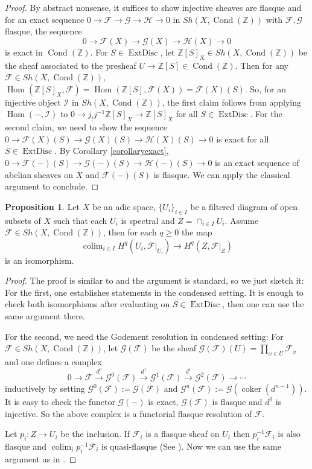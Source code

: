 \documentclass{article}
\theoremstyle{definition}
\newtheorem{proposition}[theorem]{Proposition}
\def\cG{\mathcal{G}}
\def\sF{{\mathscr{F}}}
\def\sG{{\mathscr{G}}}
\def\sH{{\mathscr{H}}}
\def\sI{{\mathscr{I}}}
\def\bZ{{\mathbb Z}}
\DeclareMathOperator{\coker}{coker}
\DeclareMathOperator{\colim}{colim}
\DeclareMathOperator{\Hom}{Hom}
\DeclareMathOperator{\cond}{Cond}
\DeclareMathOperator{\ExtDisc}{ExtDisc}
\begin{document}
	\begin{proof}
		By abstract nonsense, it suffices to show injective sheaves are flasque and for an exact sequence $0\to \sF\to \sG\to \sH\to 0$ in $\mathit{Sh}(X,\cond(\bZ))$ with $\sF,\sG$ flasque, the sequence 
		$$0\to \sF(X)\to \sG(X)\to \sH(X)\to 0$$
		is exact in $\cond(\bZ)$. For $S\in \ExtDisc$, let $\bZ[S]_X\in \mathit{Sh}(X,\cond(\bZ))$ be the sheaf associated to the presheaf $U\to \bZ[S]\in \cond(\bZ)$. Then for any $\sF\in \mathit{Sh}(X,\cond(\bZ))$, $\Hom(\bZ[S]_X,\sF)=\Hom(\bZ[S],\sF(X))=\sF(X)(S)$. So, for an injective object $\sI$ in $\mathit{Sh}(X,\cond(\bZ))$, the first claim follows from applying $\Hom(-,\sI)$ to $0\to j_!j^{-1}\bZ[S]_X\to \bZ[S]_X$ for all $S\in \ExtDisc$. For the second claim, we need to show the sequence $0\to \sF(X)(S)\to \sG(X)(S)\to \sH(X)(S)\to 0$ is exact for all $S\in \ExtDisc$. By Corollary \ref{corollaryexact}, $0\to \sF(-)(S)\to \sG(-)(S)\to \sH(-)(S)\to 0$ is an exact sequence of abelian sheaves on $X$ and $\sF(-)(S)$ is flasque. We can apply the classical argument to conclude. 
	\end{proof}
	
	
\begin{proposition}\label{propositionmaincolimit}
Let $X$ be an adic space, $\{U_i\}_{i\in I}$ be a filtered diagram of open subsets of $X$ such that each $U_i$ is spectral and $Z=\cap_{i\in I} U_i$. Assume $\sF\in \mathit{Sh}(X,\cond(\bZ))$, then for each $q\geq 0$ the map 
$$\colim_{i\in I} H^q(U_i,\sF|_{U_i})\to H^q(Z,\sF|_Z)$$
is an isomorphism.
\end{proposition}	

\begin{proof}
The proof is similar to \cite[Proposition 3.1.19]{fujiwara2017foundationsrigidgeometryi} and the argument is standard, so we just sketch it:
For the first, one establishes statements \cite[Proposition 3.1.8; 3.1.10]{fujiwara2017foundationsrigidgeometryi} in the condensed setting. It is enough to check both isomorphisms after evaluating on $S\in \ExtDisc$, then one can use the same argument there.

For the second, we need the Godement resolution in condensed setting: For $\sF\in \mathit{Sh}(X,\cond(\bZ))$, let $\cG(\sF)$ be the sheaf $\cG(\sF)(U)=\prod_{x\in U} \sF_x$ and one defines a complex 
$$0\to \sF\stackrel{d^0}\to \cG^0(\sF)\stackrel{d^1}\to \cG^1(\sF)\stackrel{d^1}\to \cG^2(\sF)\to \cdots$$
inductively by setting $\cG^0(\sF):=\cG(\sF)$ and $\cG^n(\sF):= \cG(\coker(d^{n-1}))$. It is easy to check the functor $\cG(-)$ is exact, $\cG(\sF)$ is flasque and $d^0$ is injective. So the above complex is a functorial flasque resolution of $\sF$.

Let $p_i:Z\to U_i$ be the inclusion. If $\sF_i$ is a flasque sheaf on $U_i$ then $p_i^{-1}\sF_i$ is also flasque and $\colim_i p^{-1}_i \sF_i$ is quasi-flasque (See \cite[Exercise 0.3.1]{fujiwara2017foundationsrigidgeometryi}). Now we can use the same argument as in  \cite[Proposition 3.1.19]{fujiwara2017foundationsrigidgeometryi}.
\end{proof}
\end{document}
